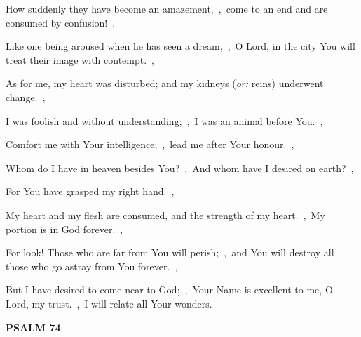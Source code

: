 \documentclass[12pt,twoside,a5paper]{article}
\newcommand{\psalm}[1]{\textbf{PSALM {#1}}\nopagebreak}
\newcommand{\translationoption}[1]{\emph{or:} #1}
\begin{document}
\begin{normalparskip}
  How suddenly they have become an amazement,~\sep\ come to an end and are consumed by confusion!~\sep

  Like one being aroused when he has seen a dream,~\sep\ O Lord, in the city You will treat their image with contempt.~\sep

  As for me, my heart was disturbed; and my kidneys (\translationoption{reins}) underwent change.~\sep

  I was foolish and without understanding;~\sep\ I was an animal before You.~\sep

  Comfort me with Your intelligence;~\sep\ lead me after Your honour.~\sep

  Whom do I have in heaven besides You?~\sep\ And whom have I desired on earth?~\sep

  For You have grasped my right hand.~\sep

  My heart and my flesh are consumed, and the strength of my heart.~\sep\ My portion is in God forever.~\sep

  For look! Those who are far from You will perish;~\sep\ and You will destroy all those who go astray from You forever.~\sep

  But I have desired to come near to God;~\sep\ Your Name is excellent to me, O Lord, my trust.~\sep\ I will relate all Your wonders.
\end{normalparskip}

\psalm{74}
\end{document}
